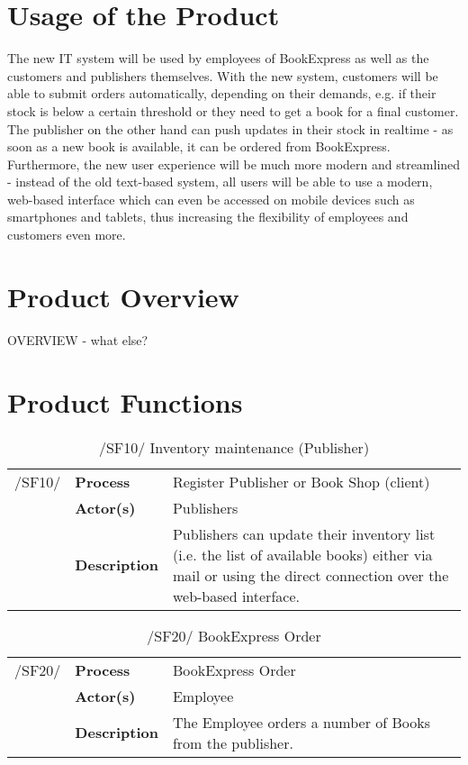 \documentclass[11pt,a4paper,oneside,svgnames]{report}
\begin{document}
\chapter{Usage of the Product}
The new IT system will be used by employees of BookExpress as well as the customers and publishers themselves. With the new system, customers will be able to submit orders automatically, depending on their demands, e.g. if their stock is below a certain threshold or they need to get a book for a final customer. The publisher on the other hand can push updates in their stock in realtime - as soon as a new book is available, it can be ordered from BookExpress. Furthermore, the new user experience will be much more modern and streamlined - instead of the old text-based system, all users will be able to use a modern, web-based interface which can even be accessed on mobile devices such as smartphones and tablets, thus increasing the flexibility of employees and customers even more.
\\
\clearpage
\chapter{Product Overview}
OVERVIEW - what else?
\\
\chapter{Product Functions}

\begin{table}[H]
\centering
\begin{tabular}{p{1.5cm}p{3cm}p{8cm}}
\cellcolor{white}/SF10/	& \textbf{Process}	& Register Publisher or Book Shop (client)\\
\cellcolor{white}		& \textbf{Actor(s)} & Publishers \\
\cellcolor{white}		& \textbf{Description}	 & Publishers can update their inventory list (i.e. the list of available books) either via mail or using the direct connection over the web-based interface. \\
\end{tabular}
\caption{/SF10/ Inventory maintenance (Publisher)}
\end{table}

\begin{table}[H]
\centering
\begin{tabular}{p{1.5cm}p{3cm}p{8cm}}
\cellcolor{white}/SF20/	& \textbf{Process}	& BookExpress Order \\
\cellcolor{white}		& \textbf{Actor(s)} & Employee \\
\cellcolor{white}		& \textbf{Description}	 &  The Employee orders a number of Books from the publisher.\\
\end{tabular}
\caption{/SF20/ BookExpress Order}
\end{table}
\end{document}
